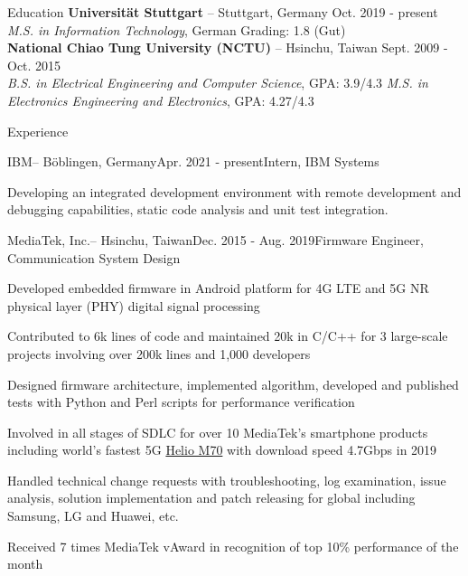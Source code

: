 \documentclass{resume} %
\begin{document}

\begin{rSection}{Education}
{\bf Universität Stuttgart }{--  Stuttgart, Germany}  \hfill {Oct. 2019 - present}\\
{\em M.S. in Information Technology}{, German Grading: 1.8 (Gut) \\ 
{\bf National Chiao Tung University (NCTU) }{--  Hsinchu, Taiwan} \hfill {Sept. 2009 - Oct. 2015}\\
{\em B.S. in Electrical Engineering and Computer Science}{, GPA: 3.9/4.3}
\em M.S. in Electronics Engineering and Electronics}{, GPA: 4.27/4.3} 

\end{rSection}

\begin{rSection}{Experience}

\begin{rSubsection}{IBM}{--  Böblingen, Germany}{Apr. 2021 - present}{Intern, IBM Systems}
\item Developing an integrated development environment with remote development and debugging capabilities, static code analysis and unit test integration. 
\end{rSubsection}

\begin{rSubsection}{MediaTek, Inc.}{--  Hsinchu, Taiwan}{Dec. 2015 - Aug. 2019}{Firmware Engineer, Communication System Design}

\item Developed embedded firmware in Android platform for 4G LTE and 5G NR physical layer (PHY) digital signal processing
\item Contributed to 6k lines of code and maintained 20k  in C/C++ for 3 large-scale projects involving over 200k lines and 1,000 developers
\item Designed firmware architecture, implemented algorithm, developed and published tests with Python and Perl scripts for performance verification 
\item Involved in all stages of SDLC for over 10 MediaTek’s smartphone products including world's fastest 5G  \href{https://www.mediatek.com/blog/heres-5gs-real-speed-live-connection-demo
}{Helio M70} with download speed 4.7Gbps in 2019
\item Handled technical change requests with troubleshooting, log examination, issue analysis, solution implementation and patch releasing for global including Samsung, LG and Huawei, etc.

\item Received 7 times MediaTek vAward in recognition of top 10\% performance of the month

\end{rSubsection}

\end{rSection}
\end{document}
